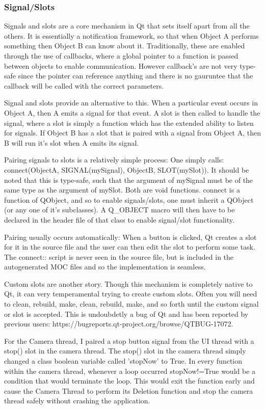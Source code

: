 \documentclass[11pt]{article} %
\begin{document}
\subsubsection{Signal/Slots}
Signals and slots are a core mechanism in Qt that sets itself apart from all the others. It is essentially a notification framework, so that when Object A performs something then Object B can know about it.  Traditionally, these are enabled through the use of callbacks, where a global pointer to a function is passed between objects to enable communication. However callback's are not very type-safe since the pointer can reference anything and there is no gauruntee that the callback will be called with the correct parameters.

Signal and slots provide an alternative to this. When a particular event occurs in Object A, then A emits a signal for that event. A slot  is then called to handle the signal, where a slot is simply a function which has the extended ability to listen for signals. If Object B has a slot that is paired with a signal from Object A, then  B will run it's slot when A emits its signal.

Pairing signals to slots is a relatively simple process: One simply calls:   connect(ObjectA, SIGNAL(mySignal), ObjectB, SLOT(mySlot)).
It should be noted that this is type-safe, such that the argument of mySignal must be of the same type as the argument of mySlot. Both are void functions.
connect is a function of QObject, and so to enable signals/slots, one must inherit a QObject (or any one of it's subclasses). A Q\_OBJECT macro will then have to be declared in the header file of that class to enable signal/slot functionality. 

Pairing usually occurs automatically: When a button is clicked, Qt creates a slot for it in the source file and the user can then edit the slot to perform some task. The connect:: script is never seen in the source file, but is included in the autogenerated MOC files and so the implementation is seamless.

Custom slots are another story. Though this mechanism is completely native to Qt, it can very temperamental trying to create custom slots. Often you will need to clean, rebuild, make, clean, rebuild, make, and so forth until the custom signal or slot is accepted. This is undoubdetly a bug of Qt and has been reported by previous users: https://bugreports.qt-project.org/browse/QTBUG-17072.

For the Camera thread, I paired a stop button signal from the UI thread with a stop() slot in the camera thread. The stop() slot in the camera thread simply changed a class boolean variable called 'stopNow' to True.  In every function within the camera thread, whenever a loop occurred  stopNow!=True would be a condition that would terminate the loop. This would exit the function early and cause the Camera Thread to perform its Deletion function and stop the camera thread safely without crashing the application.
\end{document}
